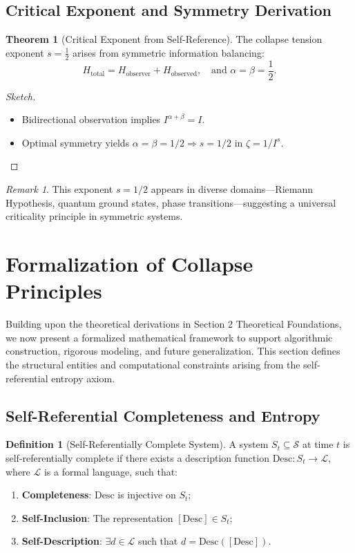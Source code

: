 \documentclass[11pt]{article}
\theoremstyle{remark}
\newtheorem{remark}{Remark}
\theoremstyle{definition}
\newtheorem{definition}{Definition}
\newtheorem{theorem}{Theorem}
\begin{document}
\subsection{Critical Exponent and Symmetry Derivation}

\begin{theorem}[Critical Exponent from Self-Reference]
The collapse tension exponent $s = \frac{1}{2}$ arises from symmetric information balancing:
\[
H_{\text{total}} = H_{\text{observer}} + H_{\text{observed}}, \quad \text{and } \alpha = \beta = \frac{1}{2}.
\]
\end{theorem}

\begin{proof}[Sketch]
\begin{itemize}
\item Bidirectional observation implies $I^{\alpha + \beta} = I$.
\item Optimal symmetry yields $\alpha = \beta = 1/2 \Rightarrow s = 1/2$ in $\zeta = 1 / I^s$.
\end{itemize}
\end{proof}

\begin{remark}
This exponent $s = 1/2$ appears in diverse domains—Riemann Hypothesis, quantum ground states, phase transitions—suggesting a universal criticality principle in symmetric systems.
\end{remark}


\section{Formalization of Collapse Principles}

Building upon the theoretical derivations in Section 2 Theoretical Foundations, we now present a formalized mathematical framework to support algorithmic construction, rigorous modeling, and future generalization. This section defines the structural entities and computational constraints arising from the self-referential entropy axiom.

\subsection{Self-Referential Completeness and Entropy}

\begin{definition}[Self-Referentially Complete System]
A system $S_t \subseteq \mathcal{S}$ at time $t$ is self-referentially complete if there exists a description function $\mathrm{Desc}: S_t \to \mathcal{L}$, where $\mathcal{L}$ is a formal language, such that:
\begin{enumerate}
\item \textbf{Completeness}: $\mathrm{Desc}$ is injective on $S_t$;
\item \textbf{Self-Inclusion}: The representation $[\mathrm{Desc}] \in S_t$;
\item \textbf{Self-Description}: $\exists d \in \mathcal{L}$ such that $d = \mathrm{Desc}([\mathrm{Desc}])$.
\end{enumerate}
\end{definition}
\end{document}
